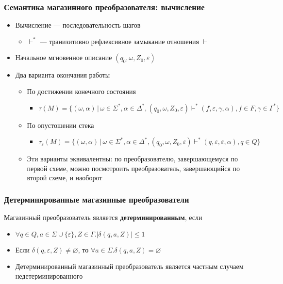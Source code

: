 \documentclass{beamer}
\begin{document}
\begin{frame}[fragile]
  \transwipe[direction=90]
  \frametitle{Семантика магазинного преобразователя: вычисление}
  \begin{itemize}
    \item Вычисление --- последовательность шагов
    \begin{itemize}
      \item $\vdash^*$ --- транизитивно рефлексивное замыкание отношения $\vdash$
    \end{itemize}
    \item Начальное мгновенное описание $(q_0, \omega, Z_0, \varepsilon)$
    \item Два варианта окончания работы
    \begin{itemize}
      \item По достижении конечного состояния
      \begin{itemize}
        \item $\tau(M) = \{ (\omega, \alpha) \, | \, \omega \in  \Sigma^*, \alpha \in \Delta^*, (q_0, \omega, Z_0, \varepsilon) \vdash^* (f, \varepsilon, \gamma, \alpha), f \in F, \gamma \in \Gamma^* \}$
      \end{itemize}
      \item По опустошении стека
      \begin{itemize}
      	\item $\tau_{\varepsilon}(M) = \{ (\omega, \alpha) \, | \, \omega \in  \Sigma^*, \alpha \in \Delta^*, (q_0, \omega, Z_0, \varepsilon) \vdash^* (q, \varepsilon, \varepsilon, \alpha), q \in Q\}$
      \end{itemize}
      \item Эти варианты эквивалентны: по преобразователю, завершающемуся по первой схеме, можно посмотроить преобразователь, завершающийся по второй схеме, и наоборот
    \end{itemize}

  \end{itemize}
\end{frame}

\begin{frame}[fragile]
  \transwipe[direction=90]
  \frametitle{Детерминированные магазинные преобразователи}
  Магазинный преобразователь является \textbf{детерминированным}, если
\begin{itemize}
	\item $\forall q \in Q, a \in \Sigma \cup \{ \varepsilon \}, Z \in \Gamma. | \delta(q, a, Z) | \leq 1$
	\item Если $ \delta(q, \varepsilon, Z) \neq \varnothing$, то $\forall a \in \Sigma. \delta(q, a, Z) = \varnothing$
	\item Детерминированный магазинный преобразователь является частным случаем недетерминированного
\end{itemize}
\end{frame}
\end{document}

